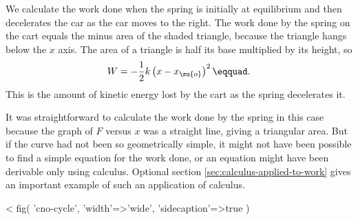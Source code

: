 We calculate the work done when the spring is initially at
equilibrium and then decelerates the car as the car moves to
the right. The work done by the spring on the cart equals
the minus area of the shaded triangle, because the triangle
hangs below the $x$ axis. The area of a triangle is half its
base multiplied by its height, so
\begin{equation*}
  W = -\frac{1}{2}k\left(x-x_\zu{o}\right)^2\eqquad.
\end{equation*}
This is the amount of kinetic energy lost by the cart as the
spring decelerates it.

It was straightforward to calculate the work done by the
spring in this case because the graph of $F$ versus $x$ was
a straight line, giving a triangular area. But if the curve
had not been so geometrically simple, it might not have been
possible to find a simple equation for the work done, or an
equation might have been derivable only using calculus.
Optional section \ref{sec:calculus-applied-to-work} gives an important example of such an
application of calculus.


<%
  fig(
    'cno-cycle',
    {
      'width'=>'wide',
      'sidecaption'=>true
    }
  )

